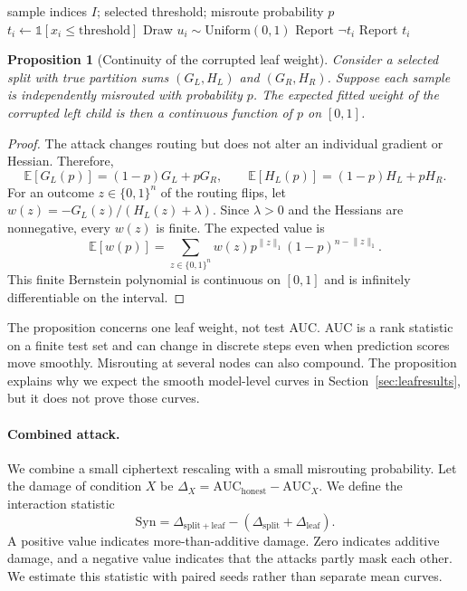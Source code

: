 \documentclass[11pt]{article}
\newtheorem{proposition}{Proposition}
\begin{document}
\begin{algorithm}[htbp]
\caption{Leaf misrouting}
\label{alg:leafmisroute}
\begin{algorithmic}[1]
\Require sample indices $I$; selected threshold; misroute probability $p$
  \State $t_i\gets\mathbb{1}[x_i\leq\mathrm{threshold}]$
  \State Draw $u_i\sim\mathrm{Uniform}(0,1)$
    \State Report $\lnot t_i$
  \Else
    \State Report $t_i$
  \EndIf
\EndFor
\end{algorithmic}
\end{algorithm}

\begin{proposition}[Continuity of the corrupted leaf weight]
\label{prop:leafcontinuity}
Consider a selected split with true partition sums $(G_L,H_L)$ and $(G_R,H_R)$. Suppose each sample is independently misrouted with probability $p$. The expected fitted weight of the corrupted left child is then a continuous function of $p$ on $[0,1]$.
\end{proposition}

\begin{proof}
The attack changes routing but does not alter an individual gradient or Hessian. Therefore,
\begin{equation}
\mathbb{E}[G_L(p)]=(1-p)G_L+pG_R, \qquad
\mathbb{E}[H_L(p)]=(1-p)H_L+pH_R.
\label{eq:leafcont}
\end{equation}
For an outcome $z\in\{0,1\}^n$ of the routing flips, let $w(z)=-G_L(z)/(H_L(z)+\lambda)$. Since $\lambda>0$ and the Hessians are nonnegative, every $w(z)$ is finite. The expected value is
\begin{equation}
\mathbb{E}[w(p)]
=\sum_{z\in\{0,1\}^n}
w(z)p^{\lVert z\rVert_1}(1-p)^{n-\lVert z\rVert_1}.
\label{eq:bernstein}
\end{equation}
This finite Bernstein polynomial is continuous on $[0,1]$ and is infinitely differentiable on the interval.
\end{proof}

The proposition concerns one leaf weight, not test AUC. AUC is a rank statistic on a finite test set and can change in discrete steps even when prediction scores move smoothly. Misrouting at several nodes can also compound. The proposition explains why we expect the smooth model-level curves in Section~\ref{sec:leafresults}, but it does not prove those curves.

\paragraph{Combined attack.}
We combine a small ciphertext rescaling with a small misrouting probability. Let the damage of condition $X$ be $\Delta_X=\mathrm{AUC}_{\mathrm{honest}}-\mathrm{AUC}_X$. We define the interaction statistic
\begin{equation}
\mathrm{Syn}
=\Delta_{\mathrm{split}+\mathrm{leaf}}
-\left(\Delta_{\mathrm{split}}+\Delta_{\mathrm{leaf}}\right).
\label{eq:synergy}
\end{equation}
A positive value indicates more-than-additive damage. Zero indicates additive damage, and a negative value indicates that the attacks partly mask each other. We estimate this statistic with paired seeds rather than separate mean curves.
\end{document}
